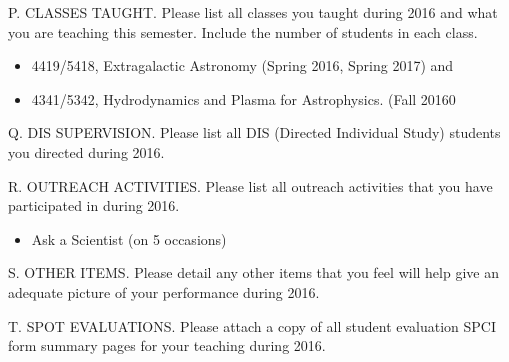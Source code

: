\noindent P. CLASSES TAUGHT. Please list all classes you taught
during 2016 and what you are teaching this semester.  Include the
number of students in each class.
\bigskip
\begin{itemize}
\item 4419/5418, Extragalactic Astronomy (Spring 2016, Spring 2017) and
\item 4341/5342, Hydrodynamics and Plasma for Astrophysics.   (Fall 20160
\end{itemize}

\noindent Q. DIS SUPERVISION. Please list all DIS (Directed
Individual Study) students you directed during 2016.
\bigskip

\noindent R. OUTREACH ACTIVITIES. Please list all outreach
activities that you have participated in during 2016.
\bigskip

\begin{itemize}
\item Ask a Scientist (on 5 occasions)
\end{itemize}

\noindent S. OTHER ITEMS. Please detail any other items that you
feel will help give an adequate picture of your performance during
2016.
\bigskip

\noindent T.  SPOT EVALUATIONS. Please attach a copy of all student
evaluation SPCI form summary pages for your teaching during 2016.






